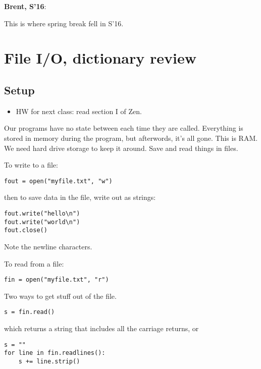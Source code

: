 \documentclass{article}
\newenvironment{reflect}[1]
{
  \noindent
  \begin{lrbox}{\reflectbox}
    \begin{minipage}[t]{\textwidth}
      \textbf{#1}:
}{
    \end{minipage}
  \end{lrbox}
  \fbox{\usebox{\reflectbox}}
}
\begin{document}
\newpage

\begin{reflect}{Brent, S'16}
  This is where spring break fell in S'16.
\end{reflect}

\section{File I/O, dictionary review}

\subsection*{Setup}

\begin{itemize}
\item HW for next class: read section I of Zen.
\end{itemize}

Our programs have no state between each time they are called.
Everything is stored in memory during the program, but afterwords,
it's all gone.  This is RAM.  We need hard drive storage to keep it
around.  Save and read things in files.

To write to a file:

\begin{verbatim}
fout = open("myfile.txt", "w")
\end{verbatim}

then to save data in the file, write out as strings:

\begin{verbatim}
fout.write("hello\n")
fout.write("world\n")
fout.close()
\end{verbatim}
Note the newline characters.

To read from a file:

\begin{verbatim}
fin = open("myfile.txt", "r")
\end{verbatim}

Two ways to get stuff out of the file.

\begin{verbatim}
s = fin.read()
\end{verbatim}

which returns a string that includes all the carriage returns, or

\begin{verbatim}
s = ""
for line in fin.readlines():
    s += line.strip()
\end{verbatim}
\end{document}
